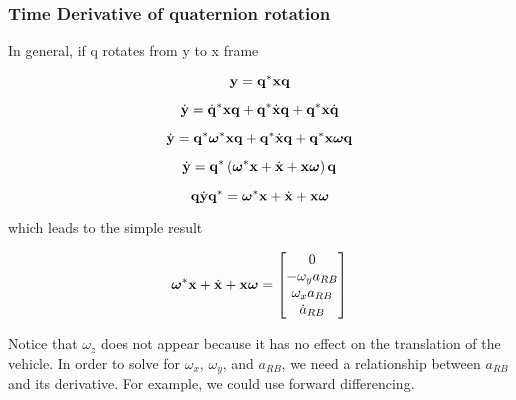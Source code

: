 \subsubsection{Time Derivative of quaternion rotation}

In general, if q rotates from y to x frame

\[
\mathbf{y} = \mathbf{q}^* \mathbf{x} \mathbf{q}
\]



\[
\dot{\mathbf{y}} = \dot{\mathbf{q}}^* \mathbf{x} \mathbf{q} + \mathbf{q}^* \dot{\mathbf{x}} \mathbf{q} + \mathbf{q}^* \mathbf{x} \dot{\mathbf{q}}
\]

\[
\dot{\mathbf{y}} = \mathbf{q}^* \boldsymbol \omega^* \mathbf{x} \mathbf{q} + \mathbf{q}^* \dot{\mathbf{x}} \mathbf{q} + \mathbf{q}^* \mathbf{x} \boldsymbol \omega \mathbf{q}
\]

\[
\dot{\mathbf{y}} = \mathbf{q}^* \left( \boldsymbol \omega^* \mathbf{x} + \dot{\mathbf{x}} + \mathbf{x} \boldsymbol \omega \right) \mathbf{q}
\]

\[
\mathbf{q} \dot{\mathbf{y}} \mathbf{q}^* = \boldsymbol \omega^* \mathbf{x} + \dot{\mathbf{x}} + \mathbf{x} \boldsymbol \omega
\]



which leads to the simple result

\[
\boldsymbol \omega^* \mathbf{x} + \dot{\mathbf{x}} + \mathbf{x} \boldsymbol \omega = 
\begin{bmatrix}
0 \\
- \omega_y a_{RB} \\
\omega_x a_{RB} \\
\dot{a}_{RB}
\end{bmatrix}
\]

Notice that $\omega_z$ does not appear because it has no effect on the translation of the vehicle.
In order to solve for $\omega_x$, $\omega_y$, and $a_{RB}$, we need a relationship between $a_{RB}$ and its derivative.
For example, we could use forward differencing.






